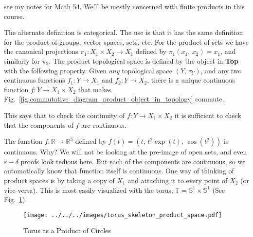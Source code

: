 \documentclass{article}
\theoremstyle{plain}
\theoremstyle{normal}
\newenvironment{example}{%
    \pushQED{\qed}\renewcommand{\qedsymbol}{$\blacksquare$}\examplex%
}{%
    \popQED\endexamplex%
}
\begin{document}
            see my notes for Math 54. We'll be mostly concerned with finite
            products in this course.
            \par\hfill\par
            The alternate definition is categorical. The use is that it has the
            same definition for the product of groups, vector spaces, sets,
            etc. For the product of sets we have the canonical projections
            $\pi_{1}:X_{1}\times{X}_{2}\rightarrow{X}_{1}$ defined by
            $\pi_{1}(x_{1},\,x_{2})=x_{1}$, and similarly for $\pi_{2}$. The
            product topological space is defined by the object in
            \textbf{Top} with the following property. Given \textit{any}
            topological space $(Y,\,\tau_{Y})$, and any two continuous functions
            $f_{1}:Y\rightarrow{X}_{1}$ and $f_{2}:Y\rightarrow{X}_{2}$, there
            is a unique continuous function $f:Y\rightarrow{X}_{1}\times{X}_{2}$
            that makes
            Fig.~\ref{fig:commutative_diagram_product_object_in_topology}
            commute.
            \par\hfill\par
            This says that to check the continuity of
            $f:Y\rightarrow{X}_{1}\times{X}_{2}$ it is sufficient to check that
            the components of $f$ are continuous.
            \begin{example}
                The function $f:\mathbb{R}\rightarrow\mathbb{R}^{3}$ defined
                by $f(t)=(t,\,t^{2}\exp(t),\,\cos(t^{2}))$ is
                continuous. Why? We will not be looking at the pre-image of
                open sets, and even $\varepsilon-\delta$ proofs look tedious
                here. But each of the components are continuous, so we
                automatically know that function itself is continuous.
            \end{example}
            One way of thinking of product spaces is by taking a copy of
            $X_{1}$ and attaching it to every point of $X_{2}$ (or vice-versa).
            This is most easily visualized with the torus,
            $\mathbb{T}=\mathbb{S}^{1}\times\mathbb{S}^{1}$ (See
            Fig.~\ref{fig:../../../images/torus_skeleton_product_space.pdf}).
            \begin{figure}
                \centering
                \texttt{[image: ../../../images/torus\_skeleton\_product\_space.pdf]}
                \caption{Torus as a Product of Circles}
                \label{fig:../../../images/torus_skeleton_product_space.pdf}
            \end{figure}
\end{document}
